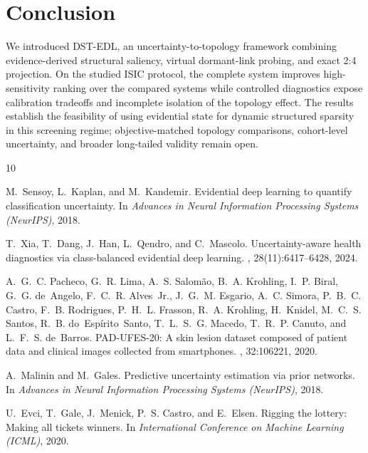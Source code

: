 \documentclass[letterpaper]{article}
\begin{document}
\section{Conclusion}\label{sec:conclusion}
We introduced DST-EDL, an uncertainty-to-topology framework combining evidence-derived structural saliency, virtual dormant-link probing, and exact 2:4 projection. On the studied ISIC protocol, the complete system improves high-sensitivity ranking over the compared systems while controlled diagnostics expose calibration tradeoffs and incomplete isolation of the topology effect. The results establish the feasibility of using evidential state for dynamic structured sparsity in this screening regime; objective-matched topology comparisons, cohort-level uncertainty, and broader long-tailed validity remain open.
\begin{thebibliography}{10}

M.~Sensoy, L.~Kaplan, and M.~Kandemir.
\newblock Evidential deep learning to quantify classification uncertainty.
\newblock In {\em Advances in Neural Information Processing Systems (NeurIPS)}, 2018.

T.~Xia, T.~Dang, J.~Han, L.~Qendro, and C.~Mascolo.
\newblock Uncertainty-aware health diagnostics via class-balanced evidential deep learning.
, 28(11):6417--6428, 2024.

A.~G.~C. Pacheco, G.~R. Lima, A.~S. Salom\~ao, B.~A. Krohling, I.~P. Biral,
G.~G. de~Angelo, F.~C.~R. Alves~Jr., J.~G.~M. Esgario, A.~C. Simora,
P.~B.~C. Castro, F.~B. Rodrigues, P.~H.~L. Frasson, R.~A. Krohling,
H.~Knidel, M.~C.~S. Santos, R.~B. do~Esp\'irito~Santo,
T.~L.~S.~G. Macedo, T.~R.~P. Canuto, and L.~F.~S. de~Barros.
\newblock PAD-UFES-20: A skin lesion dataset composed of patient data and clinical images collected from smartphones.
, 32:106221, 2020.

A.~Malinin and M.~Gales.
\newblock Predictive uncertainty estimation via prior networks.
\newblock In {\em Advances in Neural Information Processing Systems (NeurIPS)}, 2018.

U.~Evci, T.~Gale, J.~Menick, P.~S. Castro, and E.~Elsen.
\newblock Rigging the lottery: Making all tickets winners.
\newblock In {\em International Conference on Machine Learning (ICML)}, 2020.


\end{thebibliography}
\end{document}
